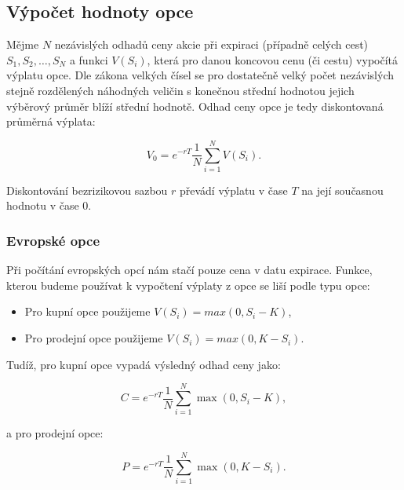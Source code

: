 \documentclass{article}
\begin{document}
\citep[Kapitola~24.3]{McDonald2013}

\subsection{Výpočet hodnoty opce}

Mějme $N$ nezávislých odhadů ceny akcie při expiraci (případně celých cest) $S_1, S_2, \dots, S_N$ a funkci $V(S_i)$, která pro danou koncovou cenu (či cestu) vypočítá výplatu opce. Dle zákona velkých čísel se pro dostatečně velký počet nezávislých stejně rozdělených náhodných veličin s konečnou střední hodnotou jejich výběrový průměr blíží střední hodnotě. Odhad ceny opce je tedy diskontovaná průměrná výplata:

\begin{equation}
  V_0 = e^{-rT} \frac{1}{N} \sum_{i=1}^{N} V(S_i).
\end{equation}

\citep[Kapitola~1.1]{Glasserman2004}

Diskontování bezrizikovou sazbou $r$ převádí výplatu v čase $T$ na její současnou hodnotu v čase $0$.

\subsubsection{Evropské opce}

Při počítání evropských opcí nám stačí pouze cena v datu expirace. Funkce, kterou budeme používat k vypočtení výplaty z opce se liší podle typu opce:

\begin{itemize}
  \item Pro kupní opce použijeme $V(S_i) = max(0, S_i - K)$,
  \item Pro prodejní opce použijeme $V(S_i) = max(0, K - S_i)$.
\end{itemize}

Tudíž, pro kupní opce vypadá výsledný odhad ceny jako:

\begin{equation}
  C = e^{-rT} \frac{1}{N} \sum_{i=1}^N \max(0, S_i - K),
\end{equation}

a pro prodejní opce:

\begin{equation}
  P = e^{-rT} \frac{1}{N} \sum_{i=1}^N \max(0, K - S_i).
\end{equation}

\citep[Kapitola~24.4]{McDonald2013}
\end{document}
